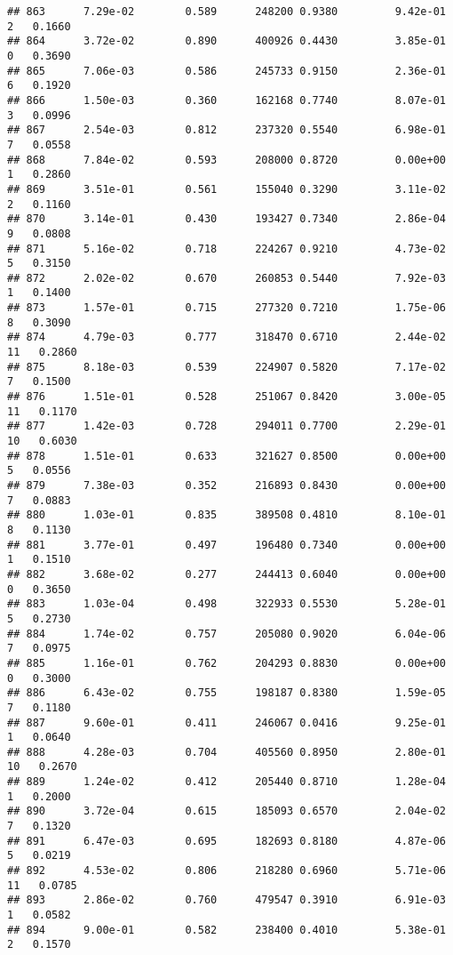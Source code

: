\documentclass[
]{article}
\begin{document}
\begin{verbatim}
## 863      7.29e-02        0.589      248200 0.9380         9.42e-01   2   0.1660
## 864      3.72e-02        0.890      400926 0.4430         3.85e-01   0   0.3690
## 865      7.06e-03        0.586      245733 0.9150         2.36e-01   6   0.1920
## 866      1.50e-03        0.360      162168 0.7740         8.07e-01   3   0.0996
## 867      2.54e-03        0.812      237320 0.5540         6.98e-01   7   0.0558
## 868      7.84e-02        0.593      208000 0.8720         0.00e+00   1   0.2860
## 869      3.51e-01        0.561      155040 0.3290         3.11e-02   2   0.1160
## 870      3.14e-01        0.430      193427 0.7340         2.86e-04   9   0.0808
## 871      5.16e-02        0.718      224267 0.9210         4.73e-02   5   0.3150
## 872      2.02e-02        0.670      260853 0.5440         7.92e-03   1   0.1400
## 873      1.57e-01        0.715      277320 0.7210         1.75e-06   8   0.3090
## 874      4.79e-03        0.777      318470 0.6710         2.44e-02  11   0.2860
## 875      8.18e-03        0.539      224907 0.5820         7.17e-02   7   0.1500
## 876      1.51e-01        0.528      251067 0.8420         3.00e-05  11   0.1170
## 877      1.42e-03        0.728      294011 0.7700         2.29e-01  10   0.6030
## 878      1.51e-01        0.633      321627 0.8500         0.00e+00   5   0.0556
## 879      7.38e-03        0.352      216893 0.8430         0.00e+00   7   0.0883
## 880      1.03e-01        0.835      389508 0.4810         8.10e-01   8   0.1130
## 881      3.77e-01        0.497      196480 0.7340         0.00e+00   1   0.1510
## 882      3.68e-02        0.277      244413 0.6040         0.00e+00   0   0.3650
## 883      1.03e-04        0.498      322933 0.5530         5.28e-01   5   0.2730
## 884      1.74e-02        0.757      205080 0.9020         6.04e-06   7   0.0975
## 885      1.16e-01        0.762      204293 0.8830         0.00e+00   0   0.3000
## 886      6.43e-02        0.755      198187 0.8380         1.59e-05   7   0.1180
## 887      9.60e-01        0.411      246067 0.0416         9.25e-01   1   0.0640
## 888      4.28e-03        0.704      405560 0.8950         2.80e-01  10   0.2670
## 889      1.24e-02        0.412      205440 0.8710         1.28e-04   1   0.2000
## 890      3.72e-04        0.615      185093 0.6570         2.04e-02   7   0.1320
## 891      6.47e-03        0.695      182693 0.8180         4.87e-06   5   0.0219
## 892      4.53e-02        0.806      218280 0.6960         5.71e-06  11   0.0785
## 893      2.86e-02        0.760      479547 0.3910         6.91e-03   1   0.0582
## 894      9.00e-01        0.582      238400 0.4010         5.38e-01   2   0.1570

\end{verbatim}
\end{document}
